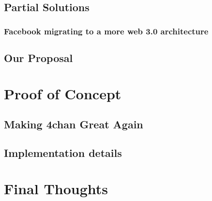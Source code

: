 \section{Partial Solutions}

\subsection{Facebook migrating to a more web 3.0 architecture}

\section{Our Proposal}

\chapter{Proof of Concept}

\section{Making 4chan Great Again}

\section{Implementation details}

\chapter{Final Thoughts}
